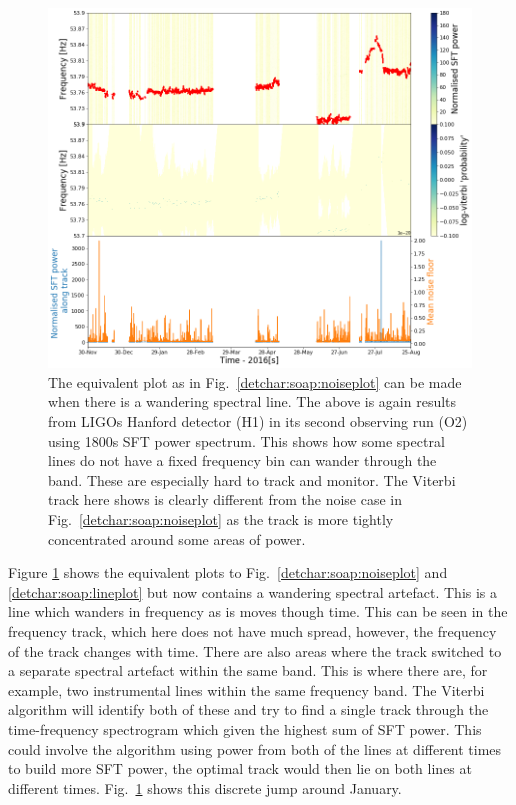 %
\begin{figure}[hpt]
	\centering
	\includegraphics[width=\textwidth]{C6_detchar/track_F53_7_53_9_wander.png}
	\caption[Example SOAP output for wandering line.]{The equivalent plot as in Fig.~\ref{detchar:soap:noiseplot} can be made when there is a wandering spectral line. The above is again results from \glspl{LIGO} Hanford detector (H1) in its second observing run (O2) using 1800s \gls{SFT} power spectrum. This shows how some spectral lines do not have a fixed frequency bin can wander through the band. These are especially hard to track and monitor. The Viterbi track here shows is clearly different from the noise case in Fig.~\ref{detchar:soap:noiseplot} as the track is more tightly concentrated around some areas of power. }
	\label{detchar:soap:wanderplot}
\end{figure}
%
Figure \ref{detchar:soap:wanderplot} shows the equivalent plots to
Fig.~\ref{detchar:soap:noiseplot} and \ref{detchar:soap:lineplot} but now
contains a wandering spectral artefact.  This is
a line which wanders in
frequency as is moves though time.  This can be seen in the frequency
track, which here does not have much spread, however, the frequency of the
track changes with time.  There are also areas where the track switched to a separate spectral artefact within the same
band. This is where there are, for example, two instrumental lines within the same frequency band. The Viterbi algorithm will identify both of these and try to find a single track through the time-frequency spectrogram which given the highest sum of \gls{SFT} power. This could involve the algorithm using power from both of the lines at different times to build more \gls{SFT} power, the optimal track would then lie on both lines at different times. Fig.~\ref{detchar:soap:wanderplot} shows this discrete jump around
January.~ 


